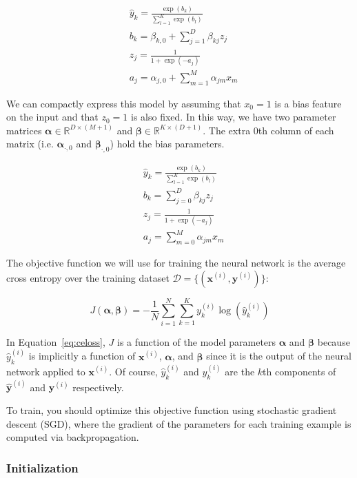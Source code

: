 \documentclass[11pt]{exam}
\numberwithin{equation}{section} %
\numberwithin{figure}{section} %
\numberwithin{table}{section} %
\newcommand{\Dc}{\mathcal{D}}
\newcommand{\Rb}{\mathbb{R}}
\newcommand{\xv}{\mathbf{x}}
\newcommand{\yv}{\mathbf{y}}
\newcommand{\alphav     }{\boldsymbol \alpha     }
\newcommand{\betav      }{\boldsymbol \beta      }
\begin{document}
\begin{align*}
&  \hat{y}_k = \frac{\exp(b_k)}{\sum_{l=1}^K \exp(b_l)}
\\
& b_k =  \beta_{k,0} + \sum_{j=1}^D \beta_{kj} z_j
\\
& z_j = \frac{1}{1+\exp(-a_j)}
\\
& a_j = \alpha_{j,0} + \sum_{m=1}^M \alpha_{jm} x_m
\end{align*}

We can compactly express this model by assuming that $x_0=1$ is a bias feature on the input and that $z_0=1$ is also fixed. In this way, we have two parameter matrices $\alphav \in \Rb^{D \times (M+1)}$ and $\betav \in \Rb^{K \times (D+1)}$. The extra $0$th column of each matrix (i.e. $\alphav_{\cdot,0}$ and $\betav_{\cdot,0}$) hold the bias parameters.

\begin{align*}
&  \hat{y}_k = \frac{\exp(b_k)}{\sum_{l=1}^K \exp(b_l)}
\\
& b_k =  \sum_{j=0}^D \beta_{kj} z_j
\\
& z_j = \frac{1}{1+\exp(-a_j)}
\\
& a_j = \sum_{m=0}^M \alpha_{jm} x_m
\end{align*}

The objective function we will use for training the neural network is the average cross entropy over the training dataset $\Dc = \{ (\xv^{(i)}, \yv^{(i)}) \}$:

\begin{equation}
\label{eq:celoss}
J(\alphav, \betav)= - \frac{1}{N} \sum_{i=1}^N \sum_{k=1}^{K} y_k^{(i)} \log (\hat{y}^{(i)}_k)
\end{equation}

In Equation~\ref{eq:celoss}, $J$ is a function of the model parameters $\alphav$ and $\betav$ because $\hat{y}^{(i)}_k$ is implicitly a function of $\xv^{(i)}$, $\alphav$, and $\betav$ since it is the output of the neural network applied to $\xv^{(i)}$. Of course, $\hat{y}^{(i)}_k$ and $y_k^{(i)}$ are the $k$th components of $\hat{\yv}^{(i)}$ and $\yv^{(i)}$ respectively.


To train, you should optimize this objective function using stochastic gradient descent (SGD), where the gradient of the parameters for each training example is computed via backpropagation.

\subsubsection{Initialization}
\label{sec:init}
\end{document}
